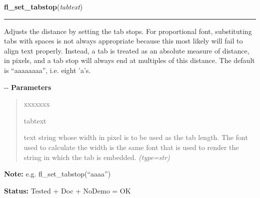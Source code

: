 \hspace{.8\funcindent}\begin{boxedminipage}{\funcwidth}

    \raggedright \textbf{fl\_set\_tabstop}(\textit{tabtext})

    \vspace{-1.5ex}

    \rule{\textwidth}{0.5\fboxrule}
\setlength{\parskip}{2ex}

Adjusts the distance by setting the tab stops. For proportional font,
substituting tabs with spaces is not always appropriate because this
most likely will fail to align text properly. Instead, a tab is
treated as an absolute measure of distance, in pixels, and a tab
stop will always end at multiples of this distance. The default is
``aaaaaaaa'', i.e. eight 'a's.

-{}-
\setlength{\parskip}{1ex}
      \textbf{Parameters}
      \vspace{-1ex}

      \begin{quote}
        \begin{Ventry}{xxxxxxx}

          \item[tabtext]


text string whose width in pixel is to be used as the tab length.
The font used to calculate the width is the same font that is used
to render the string in which the tab is embedded.
            {\it (type=str)}

        \end{Ventry}

      \end{quote}

\textbf{Note:} 
e.g. fl\_set\_tabstop(``aaaa'')


\textbf{Status:} 
Tested + Doc + NoDemo = OK


    \end{boxedminipage}

    \label{xformslib:flxbasic:fl_get_defaults}

    \vspace{0.5ex}

